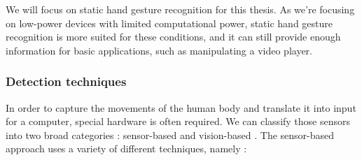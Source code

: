 \documentclass[12pt]{article}
\begin{document}
We will focus on static hand gesture recognition for this thesis. As we're focusing on low-power devices with limited computational power, static hand gesture recognition is more suited for these conditions, and it can still provide enough information for basic applications, such as manipulating a video player.

\subsubsection{Detection techniques}

In order to capture the movements of the human body and translate it into input for a computer, special hardware is often required. We can classify those sensors into two broad categories : sensor-based and vision-based \cite{qi2024computer}.
The sensor-based approach uses a variety of different techniques, namely :
\end{document}
